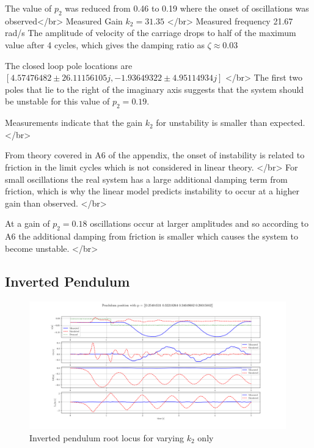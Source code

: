 \documentclass{article}
\begin{document}
The value of $p_2$ was reduced from 0.46 to 0.19 where the onset of oscillations was observed</br>
Measured Gain $k_2 = 31.35$ </br>
Measured frequency 21.67 rad/s
The amplitude of velocity of the carriage drops to half of the maximum value after 4 cycles, which gives the damping ratio as $\zeta \approx 0.03$

The closed loop pole locations are $[ 4.57476482 \pm 26.11156105j , -1.93649322 \pm 4.95114934j]$ </br>
The first two poles that lie to the right of the imaginary axis suggests that the system should be unstable for this value of $p_2 = 0.19$.


Measurements indicate that the gain $k_2$ for unstability is smaller than expected. </br>

From theory covered in A6 of the appendix, the onset of instability is related to friction in the limit cycles which is not considered in linear theory. </br>
For small oscillations the real system has a large additional damping term from friction, which is why the linear model predicts instability to occur at a higher gain than observed. </br>

At a gain of $p_2 = 0.18$ oscillations occur at larger amplitudes and so according to A6 the additional damping from friction is smaller which causes the system to become unstable. </br> 

\subsection{Inverted Pendulum}


\begin{figure}[H]
  \centering
  \includegraphics[width=0.99\textwidth]{figures/4.3.png}
  \caption{Inverted pendulum root locus for varying $k_2$ only}
  \label{fig:4.3}
\end{figure}
\end{document}
